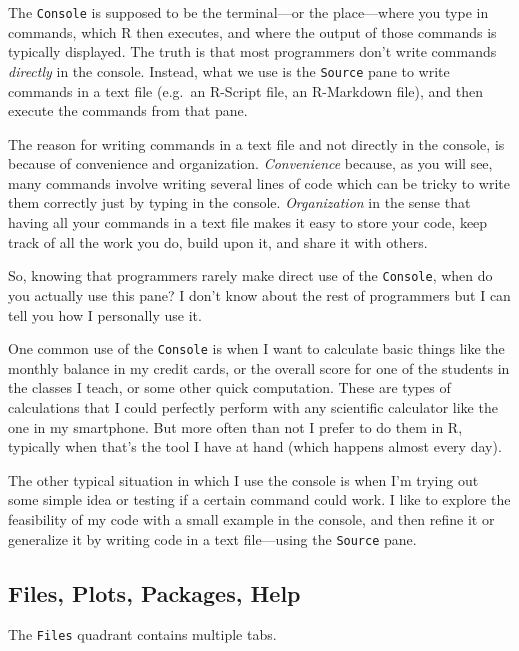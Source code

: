 \documentclass[
]{book}
\begin{document}
The \texttt{Console} is supposed to be the terminal---or the place---where you type in
commands, which R then executes, and where the output of those commands is
typically displayed. The truth is that most programmers don't write commands
\emph{directly} in the console. Instead, what we use is the \texttt{Source} pane to write
commands in a text file (e.g.~an R-Script file, an R-Markdown file), and then
execute the commands from that pane.

The reason for writing commands in a text file and not directly in the console,
is because of convenience and organization. \emph{Convenience} because, as you will
see, many commands involve writing several lines of code which can be tricky to
write them correctly just by typing in the console. \emph{Organization} in the sense
that having all your commands in a text file makes it easy to store your code,
keep track of all the work you do, build upon it, and share it with others.

So, knowing that programmers rarely make direct use of the \texttt{Console}, when
do you actually use this pane? I don't know about the rest of programmers but
I can tell you how I personally use it.

One common use of the \texttt{Console} is when I want to calculate basic things like
the monthly balance in my credit cards, or the overall score for one of the
students in the classes I teach, or some other quick computation. These are
types of calculations that I could perfectly perform with any scientific
calculator like the one in my smartphone. But more often than not I prefer to
do them in R, typically when that's the tool I have at hand (which happens
almost every day).

The other typical situation in which I use the console is when I'm trying out
some simple idea or testing if a certain command could work. I like to explore
the feasibility of my code with a small example in the console, and then refine
it or generalize it by writing code in a text file---using the \texttt{Source} pane.

\hypertarget{files-plots-packages-help}{%
\subsection{Files, Plots, Packages, Help}\label{files-plots-packages-help}}

The \texttt{Files} quadrant contains multiple tabs.
\end{document}
